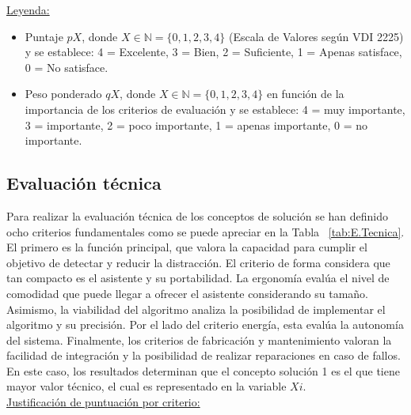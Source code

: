     \hspace{-0.7cm}\underline{Leyenda:}
    
    \begin{itemize}
    \item  Puntaje $pX$, donde $X \in \mathbb{N} = \{0, 1, 2, 3, 4\}$ (Escala de Valores según VDI 2225) y se establece: 4 = Excelente, 3 = Bien, 2 = Suficiente, 1 = Apenas satisface, 0 = No satisface. 
    \item Peso ponderado $qX$, donde $X \in \mathbb{N} = \{0, 1, 2, 3, 4\}$ en función de la importancia de los criterios de evaluación y se establece: 4 = muy importante, 3 = importante, 2 = poco importante, 1 = apenas importante, 0 = no importante.
    \end{itemize}
    
    
    
\subsection{Evaluación técnica}

Para realizar la evaluación técnica de los conceptos de solución se han definido ocho criterios fundamentales como se puede apreciar en la Tabla ~\ref{tab:E.Tecnica}. El primero es la función principal, que valora la capacidad para cumplir el objetivo de detectar y reducir la distracción. El criterio de  forma considera que tan compacto es el asistente y su portabilidad. La ergonomía evalúa el nivel de comodidad que puede llegar a ofrecer el asistente considerando su tamaño. Asimismo, la viabilidad del algoritmo analiza la posibilidad de implementar el algoritmo y su precisión. Por el lado del criterio energía, esta evalúa la autonomía del sistema. Finalmente, los criterios de fabricación y mantenimiento valoran la facilidad de integración y la posibilidad de realizar reparaciones en caso de fallos. En este caso, los resultados determinan que el concepto solución 1 es el que tiene mayor valor técnico, el cual es representado en la variable $Xi$.\\

    \hspace{-0.7cm}\underline{Justificación de puntuación por criterio:}
    
